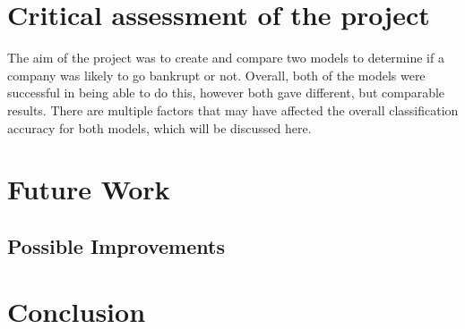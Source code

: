 \documentclass[11pt]{article}
\begin{document}
% 
 


\newpage
\section{Critical assessment of the project }
The aim of the project was to create and compare two models to determine if a company was likely to go bankrupt or not. Overall, both of the models were successful in being able to do this, however both gave different, but comparable results. 
There are multiple factors that may have affected the overall classification accuracy for both models, which will be discussed here. \\





\newpage
\section{Future Work}
\subsection{Possible Improvements}

\newpage
\section{Conclusion}
\end{document}
